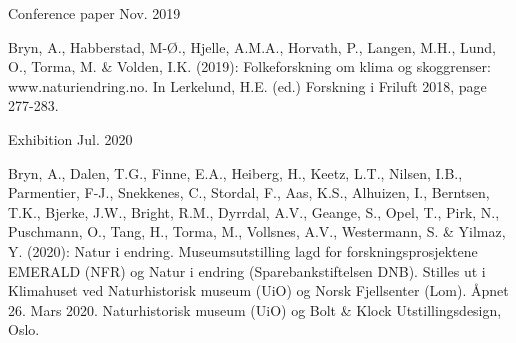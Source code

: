 
\begin{cventries}
  \cventry
  {} %
  {Conference paper} %
  {} %
  {Nov. 2019} %
  {
    \begin{cvitems} %
      \item {Bryn, A., Habberstad, M-Ø., Hjelle, A.M.A., Horvath, P., Langen, M.H., Lund, O., Torma, M. \& Volden, I.K. (2019): Folkeforskning om klima og skoggrenser: www.naturiendring.no. In Lerkelund, H.E. (ed.) Forskning i Friluft 2018, page 277-283.}
    \end{cvitems}
  }
  \cventry
    {} %
    {Exhibition} %
    {} %
    {Jul. 2020} %
    {
      \begin{cvitems} %
        \item {Bryn, A., Dalen, T.G., Finne, E.A., Heiberg, H., Keetz, L.T., Nilsen, I.B., Parmentier, F-J., Snekkenes, C., Stordal, F., Aas, K.S., Alhuizen, I., Berntsen, T.K., Bjerke, J.W., Bright, R.M., Dyrrdal, A.V., Geange, S., Opel, T., Pirk, N., Puschmann, O., Tang, H., Torma, M., Vollsnes, A.V., Westermann, S. \& Yilmaz, Y. (2020): Natur i endring. Museumsutstilling lagd for forskningsprosjektene EMERALD (NFR) og Natur i endring (Sparebankstiftelsen DNB). Stilles ut i Klimahuset ved Naturhistorisk museum (UiO) og Norsk Fjellsenter (Lom). Åpnet 26. Mars 2020. Naturhistorisk museum (UiO) og Bolt \& Klock Utstillingsdesign, Oslo.}
      \end{cvitems}
    }

\end{cventries}
